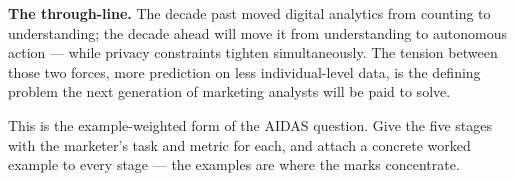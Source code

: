 \begin{qlist}
\textbf{The through-line.} The decade past moved digital analytics from
counting to understanding; the decade ahead will move it from understanding to
autonomous action --- while privacy constraints tighten simultaneously. The
tension between those two forces, more prediction on less individual-level
data, is the defining problem the next generation of marketing analysts will be
paid to solve.

This is the example-weighted form of the AIDAS question. Give the five stages
with the marketer's task and metric for each, and attach a concrete worked
example to every stage --- the examples are where the marks concentrate.


\end{qlist}
